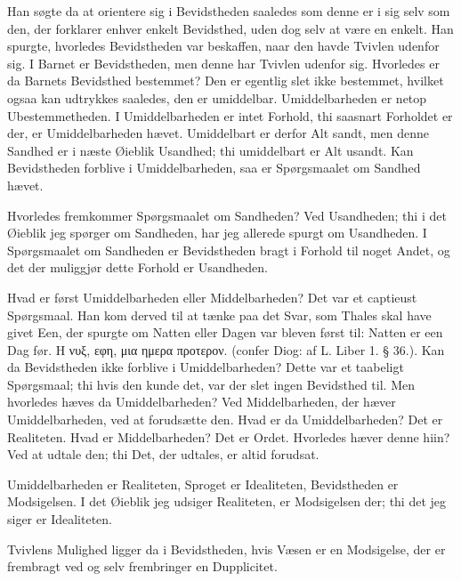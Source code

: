 \documentclass[12pt,a4paper]{article}
\begin{document}
Han søgte da at orientere sig i Bevidstheden saaledes som denne er i sig selv som den, der forklarer enhver enkelt Bevidsthed, uden dog selv at være en enkelt. Han spurgte, hvorledes Bevidstheden var beskaffen, naar den havde Tvivlen udenfor sig. I Barnet er Bevidstheden, men denne har Tvivlen udenfor sig. Hvorledes er da Barnets Bevidsthed bestemmet? Den er egentlig slet ikke bestemmet, hvilket ogsaa kan udtrykkes saaledes, den er umiddelbar. Umiddelbarheden er netop Ubestemmetheden. I Umiddelbarheden er intet Forhold, thi saasnart Forholdet er der, er Umiddelbarheden hævet. Umiddelbart er derfor Alt sandt, men denne Sandhed er i næste Øieblik Usandhed; thi umiddelbart er Alt usandt. Kan Bevidstheden forblive i Umiddelbarheden, saa er Spørgsmaalet om Sandhed hævet.

Hvorledes fremkommer Spørgsmaalet om Sandheden? Ved Usandheden; thi i det Øieblik jeg spørger om Sandheden, har jeg allerede spurgt om Usandheden. I Spørgsmaalet om Sandheden er Bevidstheden bragt i Forhold til noget Andet, og det der muliggjør dette Forhold er Usandheden.

Hvad er først Umiddelbarheden eller Middelbarheden? Det var et captieust Spørgsmaal. Han kom derved til at tænke paa det Svar, som Thales skal have givet Een, der spurgte om Natten eller Dagen var bleven først til: Natten er een Dag før. Η νυξ, εφη, μια ημερα προτερον. (confer Diog: af L. Liber 1. § 36.). Kan da Bevidstheden ikke forblive i Umiddelbarheden? Dette var et taabeligt Spørgsmaal; thi hvis den kunde det, var der slet ingen Bevidsthed til. Men hvorledes hæves da Umiddelbarheden? Ved Middelbarheden, der hæver Umiddelbarheden, ved at forudsætte den. Hvad er da Umiddelbarheden? Det er Realiteten. Hvad er Middelbarheden? Det er Ordet. Hvorledes hæver denne hiin? Ved at udtale den; thi Det, der udtales, er altid forudsat.

Umiddelbarheden er Realiteten, Sproget er Idealiteten, Bevidstheden er Modsigelsen. I det Øieblik jeg udsiger Realiteten, er Modsigelsen der; thi det jeg siger er Idealiteten.

Tvivlens Mulighed ligger da i Bevidstheden, hvis Væsen er en Modsigelse, der er frembragt ved og selv frembringer en Dupplicitet.
\end{document}
